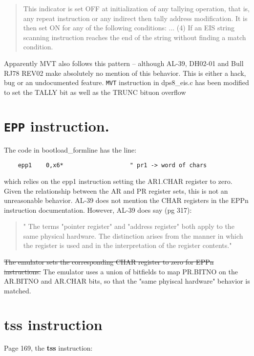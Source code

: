 \documentclass[notitlepage]{report}
\begin{document}
\begin{quote}
This indicator is set OFF at initialization of any tallying operation, that is, any repeat instruction or any indirect then 
tally address modification. It is then set ON for any of the following conditions: ...
(4) If an EIS string scanning instruction reaches the end of the string without finding a match condition.
\end{quote}

Apparently MVT also follows this pattern -- although AL-39, DH02-01 and Bull RJ78 REV02 make absolutely no mention of this behavior. 
This is either a hack, bug or an undocumented feature. \texttt{MVT} instruction in dps8\_eis.c has been modified to set the TALLY bit as well as the TRUNC bituon overflow


\section{\texttt{EPP} instruction.}

The code in bootload\_formline has the line:

\begin{verbatim}
	epp1    0,x6*                   " pr1 -> word of chars
\end{verbatim}

which relies on the epp1 instruction setting the AR1.CHAR register to zero. Given the relationship between the AR and PR register sets, this is not an unreasonable behavior. AL-39 does not mention the CHAR registers in the EPPn instruction documentation. However, AL-39 does say (pg 317):

\begin{quote}
" The terms "pointer register" and "address register" both apply to the same physical hardware. The distinction arises from the manner in which the register is used and in the interpretation of the register contents."
\end{quote}

\sout{The emulator sets the corresponding CHAR register to zero for EPPn instructions.}
The emulator uses a union of bitfields to map PR.BITNO on the AR.BITNO and AR.CHAR bits, so that the "same phyiscal hardware" behavior is matched.

\section{\textbf{tss} instruction}

Page 169, the \textbf{tss} instruction:
\end{document}
